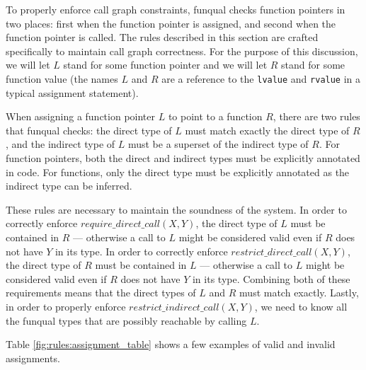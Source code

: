To properly enforce call graph constraints, funqual checks function pointers in two places:  first when the function pointer is assigned, and second when the function pointer is called.  The rules described in this section are crafted specifically to maintain call graph correctness.  For the purpose of this discussion, we will let $L$ stand for some function pointer and we will let $R$ stand for some function value (the names $L$ and $R$ are a reference to the \lstinline{lvalue} and \lstinline{rvalue} in a typical assignment statement).  

When assigning a function pointer $L$ to point to a function $R$, there are two rules that funqual checks:  the direct type of $L$ must match exactly the direct type of $R$, and the indirect type of $L$ must be a superset of the indirect type of $R$.  For function pointers, both the direct and indirect types must be explicitly annotated in code.  For functions, only the direct type must be explicitly annotated as the indirect type can be inferred.  

These rules are necessary to maintain the soundness of the system.  In order to correctly enforce $require\_direct\_call(X, Y)$, the direct type of $L$ must be contained in $R$ --- otherwise a call to $L$ might be considered valid even if $R$ does not have $Y$ in its type.  In order to correctly enforce $restrict\_direct\_call(X, Y)$, the direct type of $R$ must be contained in $L$ --- otherwise a call to $L$ might be considered valid even if $R$ does not have $Y$ in its type.  Combining both of these requirements means that the direct types of $L$ and $R$ must match exactly.  Lastly, in order to properly enforce $restrict\_indirect\_call(X, Y)$, we need to know all the funqual types that are possibly reachable by calling $L$.  

Table \ref{fig:rules:assignment_table} shows a few examples of valid and invalid assignments.  

